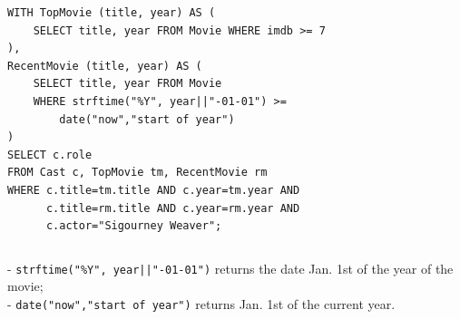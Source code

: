 \documentclass[xcolor={usenames,dvipsnames}]{beamer}
\begin{document}
%
%
\newsavebox\QueryWithTwoCTEs
\begin{lrbox}{\QueryWithTwoCTEs}\begin{minipage}{.8\textwidth}
\begin{lstlisting}[style=SQL]
WITH TopMovie (title, year) AS (
	SELECT title, year FROM Movie WHERE imdb >= 7
),
RecentMovie (title, year) AS (
	SELECT title, year FROM Movie 
	WHERE strftime("%Y", year||"-01-01") >= 
        date("now","start of year")
)
SELECT c.role
FROM Cast c, TopMovie tm, RecentMovie rm
WHERE c.title=tm.title AND c.year=tm.year AND
      c.title=rm.title AND c.year=rm.year AND
      c.actor="Sigourney Weaver";
\end{lstlisting}\end{minipage}
\end{lrbox}

%
%



%
%

\begin{frame}[fragile]

\begin{columns}[onlytextwidth]
\begin{column}{0.5\textwidth}
\scalebox{0.7}{\fbox{\usebox\QueryWithTwoCTEs}}
\end{column}
\end{columns}

- \lstinline[style=SQL]{strftime("%Y", year||"-01-01")} returns the date Jan. 1st of the year of the movie;\\ 
- \lstinline[style=SQL]{date("now","start of year")} returns Jan. 1st of the current year.


\end{frame}
\end{document}
